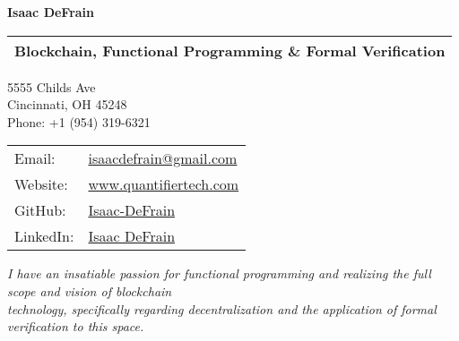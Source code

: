 \documentclass[letterpaper,10pt,oneside]{article}
\begin{document}

\begin{center}
\Huge{\textbf{Isaac DeFrain}}
\end{center}

\begin{center}
\noindent \begin{tabular}{l}
\Large{Blockchain, Functional Programming \& Formal Verification} \\
\hline
\end{tabular}
\end{center}
\vspace{-2ex}
\normalsize


\begin{center}
\begin{minipage}{0.3\textwidth}
\vfill
5555 Childs Ave \\
Cincinnati, OH 45248 \\
Phone: +1 (954) 319-6321
\vfill
\end{minipage}
\begin{minipage}{0.35\textwidth}
\begin{tabular}{@{} l l}
Email: & \href{mailto:isaacdefrain@gmail.com}{isaacdefrain@gmail.com} \\
Website: & \href{https://www.quantifiertech.com}{www.quantifiertech.com} \\
GitHub: & \href{https://github.com/Isaac-DeFrain?tab=repositories}{Isaac-DeFrain} \\
LinkedIn: & \href{https://www.linkedin.com/in/isaac-defrain-a4046b65/}{Isaac DeFrain}
\end{tabular}
\end{minipage}
\end{center}


\begin{center}
\emph{I have an insatiable passion for functional programming and realizing the full scope and vision of blockchain} \\
\emph{technology, specifically regarding decentralization and the application of formal verification to this space.}
\end{center}
\end{document}
